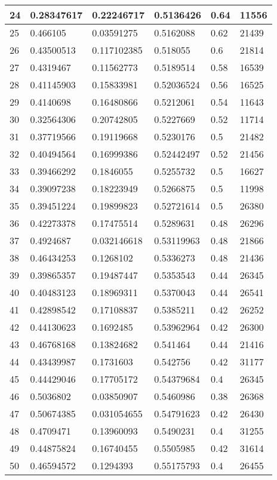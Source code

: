 \begin{longtable}{|l|l|l|l|l|l|}
24 & 0.28347617 & 0.22246717 & 0.5136426 & 0.64 & 11556 \\ \hline 
25 & 0.466105 & 0.03591275 & 0.5162088 & 0.62 & 21439 \\ \hline 
26 & 0.43500513 & 0.117102385 & 0.518055 & 0.6 & 21814 \\ \hline 
27 & 0.4319467 & 0.11562773 & 0.5189514 & 0.58 & 16539 \\ \hline 
28 & 0.41145903 & 0.15833981 & 0.52036524 & 0.56 & 16525 \\ \hline 
29 & 0.4140698 & 0.16480866 & 0.5212061 & 0.54 & 11643 \\ \hline 
30 & 0.32564306 & 0.20742805 & 0.5227669 & 0.52 & 11714 \\ \hline 
31 & 0.37719566 & 0.19119668 & 0.5230176 & 0.5 & 21482 \\ \hline 
32 & 0.40494564 & 0.16999386 & 0.52442497 & 0.52 & 21456 \\ \hline 
33 & 0.39466292 & 0.1846055 & 0.5255732 & 0.5 & 16627 \\ \hline 
34 & 0.39097238 & 0.18223949 & 0.5266875 & 0.5 & 11998 \\ \hline 
35 & 0.39451224 & 0.19899823 & 0.52721614 & 0.5 & 26380 \\ \hline 
36 & 0.42273378 & 0.17475514 & 0.5289631 & 0.48 & 26296 \\ \hline 
37 & 0.4924687 & 0.032146618 & 0.53119963 & 0.48 & 21866 \\ \hline 
38 & 0.46434253 & 0.1268102 & 0.5336273 & 0.48 & 21436 \\ \hline 
39 & 0.39865357 & 0.19487447 & 0.5353543 & 0.44 & 26345 \\ \hline 
40 & 0.40483123 & 0.18969311 & 0.5370043 & 0.44 & 26541 \\ \hline 
41 & 0.42898542 & 0.17108837 & 0.5385211 & 0.42 & 26252 \\ \hline 
42 & 0.44130623 & 0.1692485 & 0.53962964 & 0.42 & 26300 \\ \hline 
43 & 0.46768168 & 0.13824682 & 0.541464 & 0.44 & 21416 \\ \hline 
44 & 0.43439987 & 0.1731603 & 0.542756 & 0.42 & 31177 \\ \hline 
45 & 0.44429046 & 0.17705172 & 0.54379684 & 0.4 & 26345 \\ \hline 
46 & 0.5036802 & 0.03850907 & 0.5460986 & 0.38 & 26368 \\ \hline 
47 & 0.50674385 & 0.031054655 & 0.54791623 & 0.42 & 26430 \\ \hline 
48 & 0.4709471 & 0.13960093 & 0.5490231 & 0.4 & 31255 \\ \hline 
49 & 0.44875824 & 0.16740455 & 0.5505985 & 0.42 & 31614 \\ \hline 
50 & 0.46594572 & 0.1294393 & 0.55175793 & 0.4 & 26455 \\ \hline 
\end{longtable}